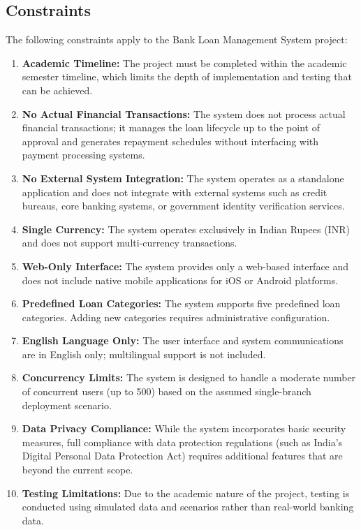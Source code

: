 \documentclass[12pt,a4paper,oneside]{report}
\begin{document}
\subsection{Constraints}

The following constraints apply to the Bank Loan Management System project:

\begin{enumerate}
  \item \textbf{Academic Timeline:} The project must be completed within the academic semester timeline, which limits the depth of implementation and testing that can be achieved.
  \item \textbf{No Actual Financial Transactions:} The system does not process actual financial transactions; it manages the loan lifecycle up to the point of approval and generates repayment schedules without interfacing with payment processing systems.
  \item \textbf{No External System Integration:} The system operates as a standalone application and does not integrate with external systems such as credit bureaus, core banking systems, or government identity verification services.
  \item \textbf{Single Currency:} The system operates exclusively in Indian Rupees (INR) and does not support multi-currency transactions.
  \item \textbf{Web-Only Interface:} The system provides only a web-based interface and does not include native mobile applications for iOS or Android platforms.
  \item \textbf{Predefined Loan Categories:} The system supports five predefined loan categories. Adding new categories requires administrative configuration.
  \item \textbf{English Language Only:} The user interface and system communications are in English only; multilingual support is not included.
  \item \textbf{Concurrency Limits:} The system is designed to handle a moderate number of concurrent users (up to 500) based on the assumed single-branch deployment scenario.
  \item \textbf{Data Privacy Compliance:} While the system incorporates basic security measures, full compliance with data protection regulations (such as India's Digital Personal Data Protection Act) requires additional features that are beyond the current scope.
  \item \textbf{Testing Limitations:} Due to the academic nature of the project, testing is conducted using simulated data and scenarios rather than real-world banking data.
\end{enumerate}
\end{document}
